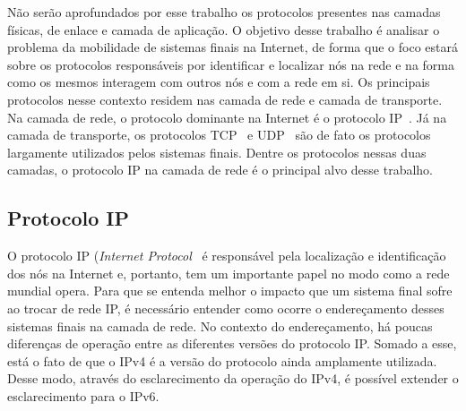 \documentclass[	12pt, Times, openright, twoside, a4paper, english, brazil]{abntex2}
\begin{document}
Não serão aprofundados por esse trabalho os protocolos presentes nas camadas físicas, de enlace e camada de aplicação. O objetivo desse trabalho é analisar o problema da mobilidade de sistemas finais na Internet, de forma que o foco estará sobre os protocolos responsáveis por identificar e localizar nós na rede e na forma como os mesmos interagem com outros nós e com a rede em si. Os principais protocolos nesse contexto residem nas camada de rede e camada de transporte. Na camada de rede, o protocolo dominante na Internet é o protocolo IP~\cite{rfc791}. Já na camada de transporte, os protocolos TCP~\cite{rfc793} e UDP~\cite{rfc768} são de fato os protocolos largamente utilizados pelos sistemas finais. Dentre os protocolos nessas duas camadas, o protocolo IP na camada de rede é o principal alvo desse trabalho.

\subsection{Protocolo IP}



O protocolo IP (\textit{Internet Protocol}~\cite{rfc791} é  responsável pela localização e identificação dos nós na Internet e, portanto, tem um importante papel no modo como a rede mundial opera. Para que se entenda melhor o impacto que um sistema final sofre ao trocar de rede IP, é necessário entender como ocorre o endereçamento desses sistemas finais na camada de rede. No contexto do endereçamento, há poucas diferenças de operação entre as diferentes versões do protocolo IP. Somado a esse, está o fato de que o IPv4 é a versão do protocolo ainda amplamente utilizada. Desse modo, através do esclarecimento da operação do IPv4, é possível extender o esclarecimento para o IPv6.
\end{document}

